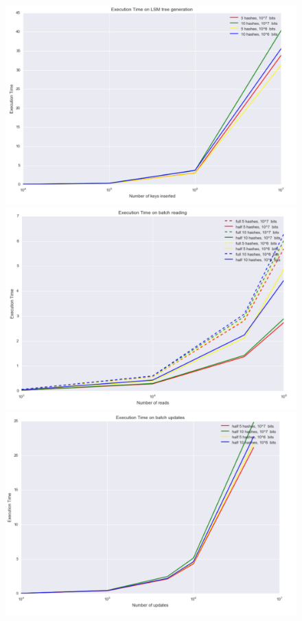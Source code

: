 \documentclass{sig-alternate-05-2015}
\begin{document}
\begin{figure}[H]
   \begin{minipage}[b]{\columnwidth}
    \includegraphics[width=\columnwidth]{img/bloom_gene}
  \end{minipage}
  \begin{minipage}[b]{\columnwidth}
    \includegraphics[width=\columnwidth]{img/bloom_reading}
  \end{minipage}
  \begin{minipage}[b]{\columnwidth}
    \includegraphics[width=\columnwidth]{img/bloom_updates}

\end{minipage}
\end{figure}
\end{document}
